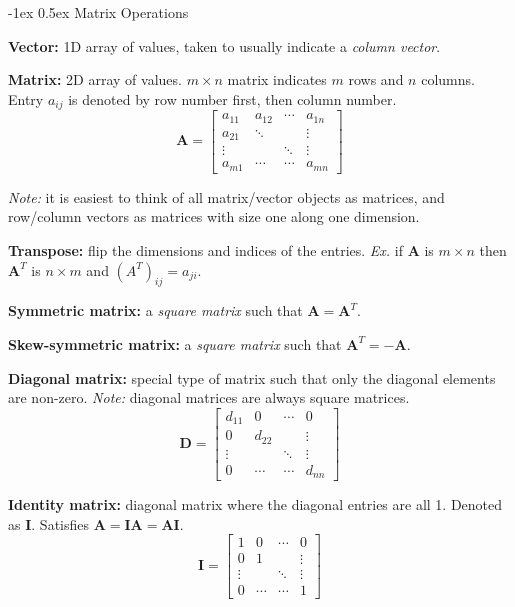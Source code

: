 \documentclass[10pt,landscape]{article}
\makeatletter
\renewcommand{\section}{\@startsection{section}{1}{0mm}%
                                {-1ex}%
                                {0.5ex}%
                                {\normalfont\large\bfseries}}
\makeatother
\begin{document}
\begin{multicols}{3}
\section{Matrix Operations}
\par \textbf{Vector:} 1D array of values, taken to usually indicate a \textit{column vector}.
\par \textbf{Matrix:} 2D array of values. $m\times n$ matrix indicates $m$ rows and $n$ columns. Entry $a_{ij}$ is denoted by row number first, then column number. 
\[\mathbf{A} = \left[ \begin{array}{cccc}
a_{11} & a_{12} & \cdots & a_{1n} \\ 
a_{21} & \ddots & &\vdots \\
\vdots & &\ddots & \vdots \\
a_{m1} & \cdots & \cdots & a_{mn} \end{array} \right] \]
\par \textit{Note:} it is easiest to think of all matrix/vector objects as matrices, and row/column vectors as matrices with size one along one dimension.

\par \textbf{Transpose:} flip the dimensions and indices of the entries. \textit{Ex.} if $\mathbf{A}$ is $m \times n$ then $\mathbf{A}^T$ is $n \times m$ and $(A^T)_{ij} = a_{ji}$. 
\par \textbf{Symmetric matrix:} a \textit{square matrix} such that $\mathbf{A} = \mathbf{A}^T$. 
\par \textbf{Skew-symmetric matrix:} a \textit{square matrix} such that $\mathbf{A}^T = - \mathbf{A}$.
\par \textbf{Diagonal matrix:} special type of matrix such that only the diagonal elements are non-zero. \textit{Note:} diagonal matrices are always square matrices.
\[ \mathbf{D} = \left[ \begin{array}{cccc} 
d_{11} & 0 & \cdots & 0 \\
0 & d_{22} &  & \vdots \\
\vdots & & \ddots & \vdots\\
0 & \cdots & \cdots & d_{nn} \end{array} \right]\]

\par \textbf{Identity matrix:} diagonal matrix where the diagonal entries are all 1. Denoted as $\mathbf{I}$. Satisfies $\mathbf{A} = \mathbf{I}\mathbf{A} = \mathbf{A}\mathbf{I}$. 
\[ \mathbf{I} = \left[ \begin{array}{cccc} 
1 & 0 & \cdots & 0 \\
0 & 1 &  & \vdots \\
\vdots & & \ddots & \vdots\\
0 & \cdots & \cdots & 1 \end{array} \right]\]

\end{multicols}
\end{document}
